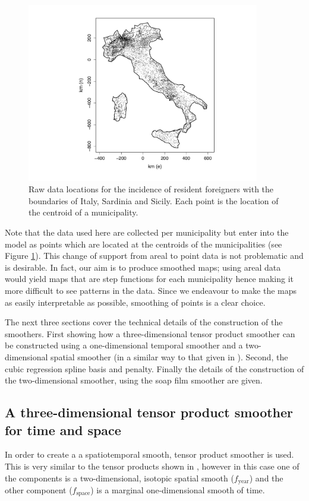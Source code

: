\begin{figure}[tbp]
	\centering
		\includegraphics[width=4in]{it/pointmap.pdf}
	\caption{Raw data locations for the incidence of resident foreigners with the boundaries of Italy, Sardinia and Sicily. Each point is the location of the centroid of a municipality.}
	\label{pointmap}
\end{figure}

Note that the data used here are collected per municipality but enter into the model as points which are located at the centroids of the municipalities (see Figure \ref{pointmap}). This change of support from areal to point data is not problematic and is desirable. In fact, our aim is to produce smoothed maps; using areal data would yield maps that are step functions for each municipality hence making it more difficult to see patterns in the data. Since we endeavour to make the maps as easily interpretable as possible, smoothing of points is a clear choice.

The next three sections cover the technical details of the construction of the smoothers. First showing how a three-dimensional tensor product smoother can be constructed using a one-dimensional temporal smoother and a two-dimensional spatial smoother (in a similar way to that given in ). Second, the cubic regression spline basis and penalty. Finally the details of the construction of the two-dimensional smoother, using the soap film smoother are given.

\subsection{A three-dimensional tensor product smoother for time and space \label{3D}}

In order to create a a spatiotemporal smooth, tensor product smoother is used. This is very similar to the tensor products shown in , however in this case one of the components is a two-dimensional, isotopic spatial smooth ($f_\text{year}$) and the other component ($f_\text{space}$) is a marginal one-dimensional smooth of time. 

